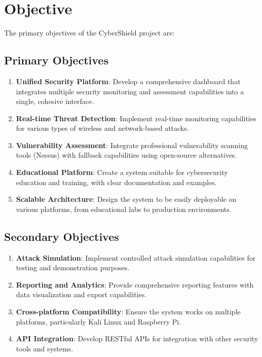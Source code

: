 \documentclass[12pt,a4paper]{report}
\begin{document}
\section{Objective}

The primary objectives of the CyberShield project are:

\subsection{Primary Objectives}
\begin{enumerate}
    \item \textbf{Unified Security Platform}: Develop a comprehensive dashboard that integrates multiple security monitoring and assessment capabilities into a single, cohesive interface.
    
    \item \textbf{Real-time Threat Detection}: Implement real-time monitoring capabilities for various types of wireless and network-based attacks.
    
    \item \textbf{Vulnerability Assessment}: Integrate professional vulnerability scanning tools (Nessus) with fallback capabilities using open-source alternatives.
    
    \item \textbf{Educational Platform}: Create a system suitable for cybersecurity education and training, with clear documentation and examples.
    
    \item \textbf{Scalable Architecture}: Design the system to be easily deployable on various platforms, from educational labs to production environments.
\end{enumerate}

\subsection{Secondary Objectives}
\begin{enumerate}
    \item \textbf{Attack Simulation}: Implement controlled attack simulation capabilities for testing and demonstration purposes.
    
    \item \textbf{Reporting and Analytics}: Provide comprehensive reporting features with data visualization and export capabilities.
    
    \item \textbf{Cross-platform Compatibility}: Ensure the system works on multiple platforms, particularly Kali Linux and Raspberry Pi.
    
    \item \textbf{API Integration}: Develop RESTful APIs for integration with other security tools and systems.
\end{enumerate}
\end{document}
